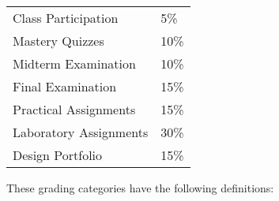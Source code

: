 \documentclass[11pt]{article}
\begin{document}
\begin{center}
  \begin{tabular}{ll}
    Class Participation        & 5\%  \\
    Mastery Quizzes            & 10\% \\
    Midterm Examination        & 10\% \\
    Final Examination          & 15\% \\
    Practical Assignments      & 15\% \\
    Laboratory Assignments     & 30\% \\
    Design Portfolio           & 15\%
  \end{tabular}
\end{center}

\vspace*{-.05in}

\noindent
These grading categories have the following definitions:

\vspace*{-.05in}
\end{document}
